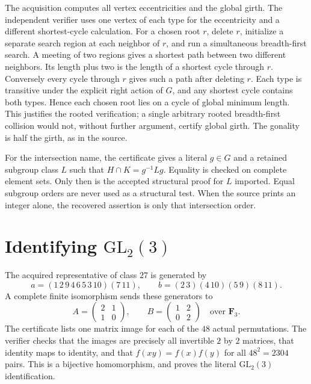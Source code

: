 \documentclass[11pt]{article}
\begin{document}
The acquisition computes all vertex eccentricities and the global girth.
The independent verifier uses one vertex of each type for the eccentricity
and a different shortest-cycle calculation. For a chosen root $r$, delete
$r$, initialize a separate search region at each neighbor of $r$, and run
a simultaneous breadth-first search. A meeting of two regions gives a
shortest path between two different neighbors. Its length plus two is the
length of a shortest cycle through $r$. Conversely every cycle through $r$
gives such a path after deleting $r$. Each type is transitive under the
explicit right action of $G$, and any shortest cycle contains both types.
Hence each chosen root lies on a cycle of global minimum length. This
justifies the rooted verification; a single arbitrary rooted breadth-first
collision would not, without further argument, certify global girth.
The gonality is half the girth, as in the source.

For the intersection name, the certificate gives a literal $g\in G$ and a
retained subgroup class $L$ such that $H\cap K=g^{-1}Lg$. Equality is checked
on complete element sets. Only then is the accepted structural proof for
$L$ imported. Equal subgroup orders are never used as a structural test.
When the source prints an integer alone, the recovered assertion is only
that intersection order.

\section{Identifying $\mathrm{GL}_2(3)$}
The acquired representative of class $27$ is generated by
\[
 a=(1\,2\,9\,4\,6\,5\,3\,10)(7\,11),\qquad
 b=(2\,3)(4\,10)(5\,9)(8\,11).
\]
A complete finite isomorphism sends these generators to
\[
 A=\begin{pmatrix}2&1\\1&0\end{pmatrix},\qquad
 B=\begin{pmatrix}1&2\\0&2\end{pmatrix}
       \quad\text{over }\mathbf F_3.
\]
The certificate lists one matrix image for each of the $48$ actual
permutations. The verifier checks that the images are precisely all
invertible $2$ by $2$ matrices, that identity maps to identity, and that
$f(xy)=f(x)f(y)$ for all $48^2=2304$ pairs. This is a bijective homomorphism,
and proves the literal $\mathrm{GL}_2(3)$ identification.
\end{document}
